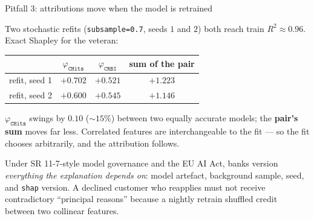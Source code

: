 \documentclass[aspectratio=169,11pt]{beamer}
\begin{document}
\begin{frame}{Pitfall 3: attributions move when the model is retrained}
  \begin{numexample}
    Two stochastic refits (\texttt{subsample=0.7}, seeds $1$ and $2$) both reach
    train $R^2 \approx 0.96$. Exact Shapley for the veteran:
    \begin{center}
    \begin{tabular}{@{}lccc@{}}
      \toprule
      & $\varphi_{\texttt{CHits}}$ & $\varphi_{\texttt{CRBI}}$ & sum of the pair \\
      \midrule
      refit, seed 1 & $+0.702$ & $+0.521$ & $+1.223$ \\
      refit, seed 2 & $+0.600$ & $+0.545$ & $+1.146$ \\
      \bottomrule
    \end{tabular}
    \end{center}
    $\varphi_{\texttt{CHits}}$ swings by $0.10$ ($\sim15\%$) between two equally
    accurate models; the \textbf{pair's sum} moves far less. Correlated features are
    interchangeable to the fit --- so the fit chooses arbitrarily, and the
    attribution follows.
  \end{numexample}
  \begin{industry}
    Under SR 11-7-style model governance and the EU AI Act, banks version
    \emph{everything the explanation depends on}: model artefact, background sample,
    seed, and \texttt{shap} version. A declined customer who reapplies must not
    receive contradictory ``principal reasons'' because a nightly retrain shuffled
    credit between two collinear features.
  \end{industry}
\end{frame}
\end{document}
